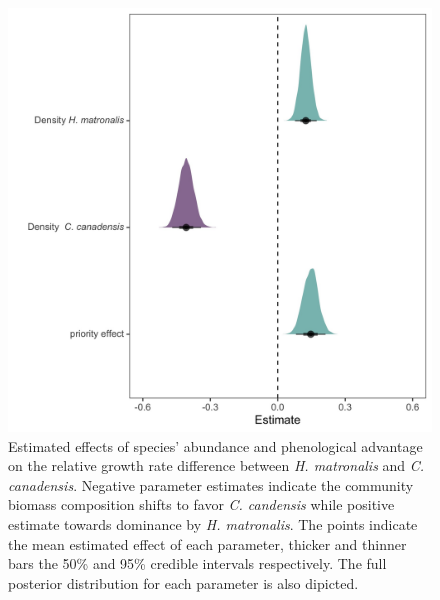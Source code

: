 \documentclass{article}\usepackage[]{graphicx}\usepackage[]{color}
\begin{document}
\begin{figure}[h!]
    \centering
\includegraphics[width=\textwidth]{..//figure/mu_plots.jpeg}
    \caption{Estimated effects of species' abundance and phenological advantage on the relative growth rate difference between \textit{H. matronalis} and \textit{C. canadensis}. Negative parameter estimates indicate the community biomass composition shifts to favor \textit{C. candensis} while positive estimate towards dominance by \textit{ H. matronalis}. The points indicate the mean estimated effect of each parameter, thicker  and thinner bars the 50\% and 95\% credible intervals respectively. The full posterior distribution for each parameter is also dipicted. 
    } 
    \label{fig:RGRD}
\end{figure}
\end{document}
